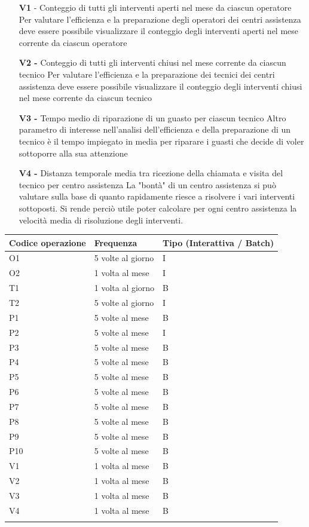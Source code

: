 \documentclass[a4paper, 12pt]{report}
\begin{document}
\begin{itemize}
	\item[\textbf{V1} -] Conteggio di tutti gli interventi aperti nel mese da ciascun operatore
		\subitem Per valutare l'efficienza e la preparazione degli operatori dei centri assistenza deve essere
		possibile visualizzare il conteggio degli interventi aperti nel mese corrente da ciascun operatore
	\item[\textbf{V2 -}] Conteggio di tutti gli interventi chiusi nel mese corrente da ciascun tecnico
		\subitem Per valutare l'efficienza e la preparazione dei tecnici dei centri assistenza deve essere
		possibile visualizzare il conteggio degli interventi chiusi nel mese corrente da ciascun tecnico
	\item[\textbf{V3 -}] Tempo medio di riparazione di un guasto per ciascun tecnico
		\subitem Altro parametro di interesse nell'analisi dell'efficienza e della preparazione di un tecnico è il tempo impiegato in media per riparare i guasti
		che decide di voler sottoporre alla sua attenzione
	\item[\textbf{V4 -}] Distanza temporale media tra ricezione della chiamata e visita del tecnico per centro assistenza
		\subitem La "bontà" di un centro assistenza si può valutare sulla base di quanto rapidamente riesce a risolvere i vari interventi sottoposti. Si rende perciò
		utile poter calcolare per ogni centro assistenza la velocità media di risoluzione degli interventi.
\end{itemize}

\begin{tabularx}{\linewidth}{X|X|X}
	\hline
	\textbf{Codice operazione} & \textbf{Frequenza} & \textbf{Tipo (Interattiva / Batch)}\\
	\hline
	\hline
	O1 & 5 volte al giorno & I\\
	\hline
	O2 & 1 volta al mese & I\\
	\hline
	T1 & 1 volta al giorno & B\\
	\hline
	T2 & 5 volte al giorno & I\\
	\hline
	P1 & 5 volte al mese & B\\
	\hline
	P2 & 5 volte al mese & I\\
	\hline
	P3 & 5 volte al mese & B\\
	\hline
	P4 & 5 volte al mese & B\\
	\hline
	P5 & 5 volte al mese & B\\
	\hline
	P6 & 5 volte al mese & B\\
	\hline
	P7 & 5 volte al mese & B\\
	\hline
	P8 & 5 volte al mese & B\\
	\hline
	P9 & 5 volte al mese & B\\
	\hline
	P10 & 5 volte al mese & B\\
	\hline
	V1 & 1 volta al mese & B\\
	\hline
	V2 & 1 volta al mese & B\\
	\hline
	V3 & 1 volta al mese & B\\
	\hline
	V4 & 1 volta al mese & B\\
	\hline
	\caption{Tabella della frequenza delle principali operazioni}
\end{tabularx}
\end{document}
